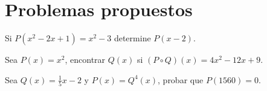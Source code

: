 \section{Problemas propuestos}

\begin{section-problem}
    Si $P(x^2 - 2x + 1) = x^2 - 3$ determine $P(x - 2).$
\end{section-problem}

\begin{section-problem}
    Sea $P(x) = x^2$, encontrar $Q(x)$ si $(P \circ Q)(x) = 4x^2 - 12x + 9$.
\end{section-problem}

\begin{section-problem}
    Sea $Q(x) = \frac{1}{5} x - 2$ y $P(x) = Q^4(x)$, probar que $P(1560) = 0$.
\end{section-problem}

